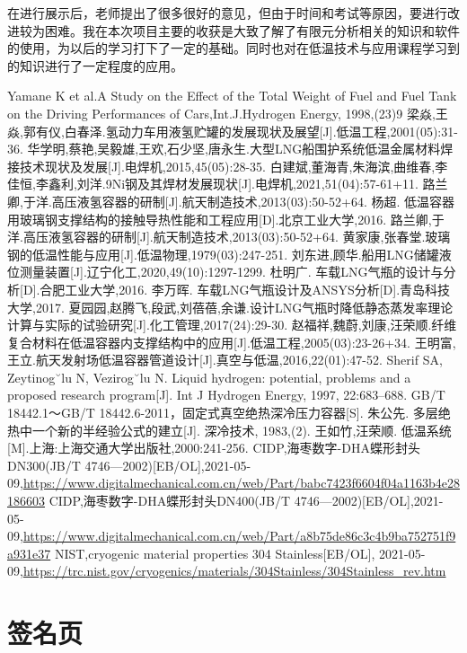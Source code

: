 \documentclass[UTF8,a4paper]{ctexart}
\begin{document}
	在进行展示后，老师提出了很多很好的意见，但由于时间和考试等原因，要进行改进较为困难。我在本次项目主要的收获是大致了解了有限元分析相关的知识和软件的使用，为以后的学习打下了一定的基础。同时也对在低温技术与应用课程学习到的知识进行了一定程度的应用。
	\newpage
	\clearpage
	\begin{thebibliography}{99}
		
		Yamane K et al.A Study on the Effect of the Total Weight of Fuel and Fuel Tank on the Driving Performances of Cars,Int.J.Hydrogen Energy, 1998,(23)9
		梁焱,王焱,郭有仪,白春泽.氢动力车用液氢贮罐的发展现状及展望[J].低温工程,2001(05):31-36.
		华学明,蔡艳,吴毅雄,王欢,石少坚,唐永生.大型LNG船围护系统低温金属材料焊接技术现状及发展[J].电焊机,2015,45(05):28-35.
		白建斌,董海青,朱海滨,曲维春,李佳恒,李鑫利,刘洋.9Ni钢及其焊材发展现状[J].电焊机,2021,51(04):57-61+11.
		路兰卿,于洋.高压液氢容器的研制[J].航天制造技术,2013(03):50-52+64.
		杨超. 低温容器用玻璃钢支撑结构的接触导热性能和工程应用[D].北京工业大学,2016.
		路兰卿,于洋.高压液氢容器的研制[J].航天制造技术,2013(03):50-52+64.
		黄家康,张春堂.玻璃钢的低温性能与应用[J].低温物理,1979(03):247-251.
		刘东进,顾华.船用LNG储罐液位测量装置[J].辽宁化工,2020,49(10):1297-1299.
		杜明广. 车载LNG气瓶的设计与分析[D].合肥工业大学,2016.
		李万晖. 车载LNG气瓶设计及ANSYS分析[D].青岛科技大学,2017.
		夏园园,赵腾飞,段武,刘蓓蓓,余谦.设计LNG气瓶时降低静态蒸发率理论计算与实际的试验研究[J].化工管理,2017(24):29-30.
		赵福祥,魏蔚,刘康,汪荣顺.纤维复合材料在低温容器内支撑结构中的应用[J].低温工程,2005(03):23-26+34.
		王明富,王立.航天发射场低温容器管道设计[J].真空与低温,2016,22(01):47-52.
		Sherif SA, Zeytinog˘lu N, Vezirog˘lu N. Liquid hydrogen: potential, problems and  a  proposed  research  program[J].  Int  J  Hydrogen  Energy,  1997,  22:683–688.
		GB/T 18442.1～GB/T 18442.6-2011，固定式真空绝热深冷压力容器[S].
		朱公先. 多层绝热中一个新的半经验公式的建立[J].  深冷技术, 1983,(2).
		王如竹,汪荣顺. 低温系统[M].上海:上海交通大学出版社,2000:241-256.
		CIDP,海枣数字-DHA蝶形封头DN300(JB/T 4746—2002)[EB/OL],2021-05-09,\url{https://www.digitalmechanical.com.cn/web/Part/babc7423f6604f04a1163b4e28186603}%
		CIDP,海枣数字-DHA蝶形封头DN400(JB/T 4746—2002)[EB/OL],2021-05-09,\url{https://www.digitalmechanical.com.cn/web/Part/a8b75de86c3c4b9ba752751f9a931e37}%
		NIST,cryogenic material properties 304 Stainless[EB/OL], 2021-05-09,\url{https://trc.nist.gov/cryogenics/materials/304Stainless/304Stainless_rev.htm}%
		
	\end{thebibliography}
	\newpage
	\section*{签名页}
\end{document}
